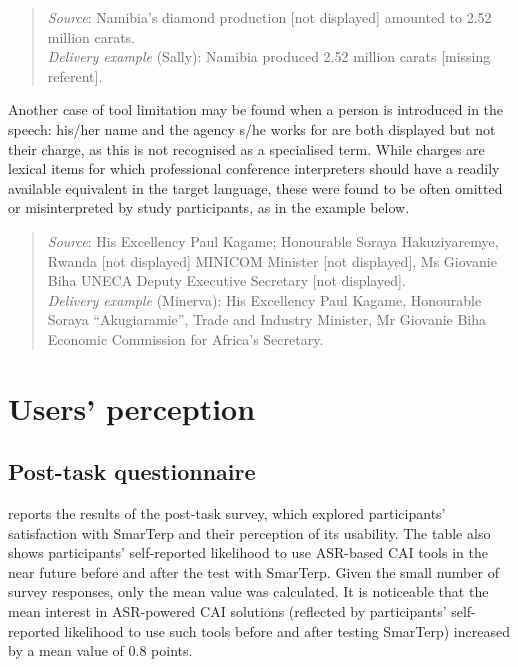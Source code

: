 \begin{quote}
\textit{Source}:  Namibia's diamond production [not displayed] amounted to 2.52 million carats.\\
\textit{Delivery example} (Sally): Namibia produced 2.52 million carats [missing referent].
\end{quote}

Another case of tool limitation may be found when a person is introduced in the speech: his/her name and the agency s/he works for are both displayed but not their charge, as this is not recognised as a specialised term. While charges are lexical items for which professional conference interpreters should have a readily available equivalent in the target language, these were found to be often omitted or misinterpreted by study participants, as in the example below.

\begin{quote}
\textit{Source}: His Excellency Paul Kagame; Honourable Soraya Hakuziyaremye, Rwanda [not displayed] MINICOM Minister [not displayed], Ms Giovanie Biha UNECA Deputy Executive Secretary [not displayed].\\
\textit{Delivery example} (Minerva): His Excellency Paul Kagame, Honourable Soraya ``Akugiaramie'', Trade and Industry Minister, Mr Giovanie Biha Economic Commission for Africa’s Secretary.

\end{quote}


\section{Users' perception}




\subsection{Post-task questionnaire}


 reports the results of the post-task survey, which explored participants’ satisfaction with SmarTerp and their perception of its usability. The table also shows participants’ self-reported likelihood to use ASR-based CAI tools in the near future before and after the test with SmarTerp. Given the small number of survey responses, only the mean value was calculated. It is noticeable that the mean interest in ASR-powered CAI solutions (reflected by participants’ self-reported likelihood to use such tools before and after testing SmarTerp) increased by a mean value of 0.8 points.


